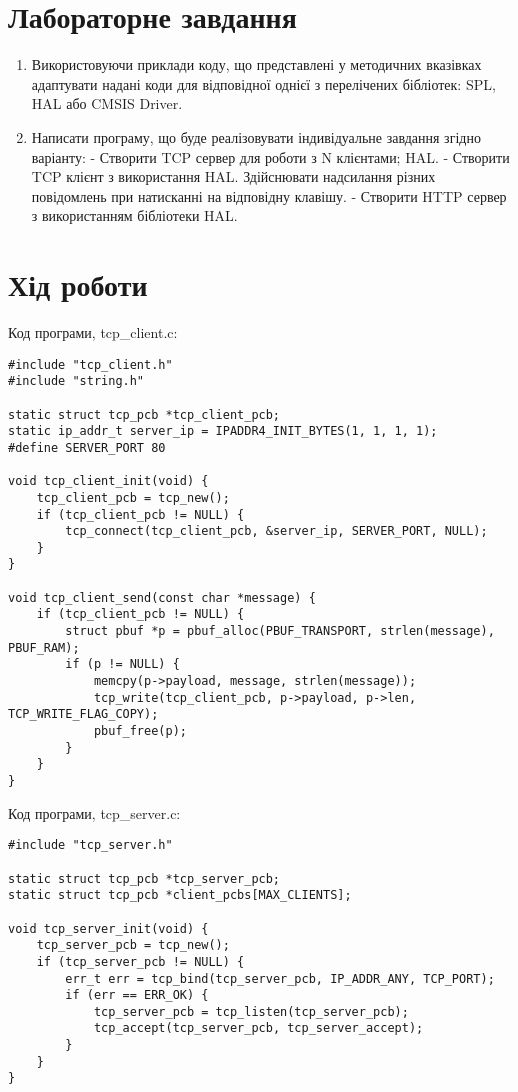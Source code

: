 \documentclass[oneside,14pt]{extarticle}
\begin{document}
\begin{normalsize}
  \section*{Лабораторне завдання}
  \begin{enumerate}
  	\item Використовуючи приклади коду, що представлені у методичних вказівках адаптувати надані
коди для відповідної однієї з перелічених бібліотек: SPL, HAL або CMSIS Driver.
  \item Написати програму, що буде реалізовувати індивідуальне завдання згідно варіанту:
- Створити TCP сервер для роботи з N клієнтами; HAL.
- Створити TCP клієнт з використання HAL. Здійснювати надсилання різних повідомлень при
натисканні на відповідну клавішу.
- Створити HTTP сервер з використанням бібліотеки HAL.
  \end{enumerate}
  
  \section*{Хід роботи}
  
Код програми, tcp\_client.c:
  
{\small\begin{lstlisting}
#include "tcp_client.h"
#include "string.h"

static struct tcp_pcb *tcp_client_pcb;
static ip_addr_t server_ip = IPADDR4_INIT_BYTES(1, 1, 1, 1);
#define SERVER_PORT 80

void tcp_client_init(void) {
	tcp_client_pcb = tcp_new();
	if (tcp_client_pcb != NULL) {
		tcp_connect(tcp_client_pcb, &server_ip, SERVER_PORT, NULL);
	}
}

void tcp_client_send(const char *message) {
	if (tcp_client_pcb != NULL) {
		struct pbuf *p = pbuf_alloc(PBUF_TRANSPORT, strlen(message), PBUF_RAM);
		if (p != NULL) {
			memcpy(p->payload, message, strlen(message));
			tcp_write(tcp_client_pcb, p->payload, p->len, TCP_WRITE_FLAG_COPY);
			pbuf_free(p);
		}
	}
}\end{lstlisting}}

Код програми, tcp\_server.c:
  
{\small\begin{lstlisting}
#include "tcp_server.h"

static struct tcp_pcb *tcp_server_pcb;
static struct tcp_pcb *client_pcbs[MAX_CLIENTS];

void tcp_server_init(void) {
    tcp_server_pcb = tcp_new();
    if (tcp_server_pcb != NULL) {
        err_t err = tcp_bind(tcp_server_pcb, IP_ADDR_ANY, TCP_PORT);
        if (err == ERR_OK) {
            tcp_server_pcb = tcp_listen(tcp_server_pcb);
            tcp_accept(tcp_server_pcb, tcp_server_accept);
        }
    }
}


\end{lstlisting}}
\end{normalsize}
\end{document}
